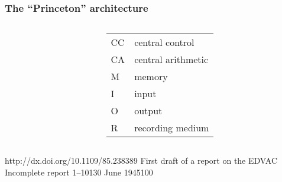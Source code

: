 \documentclass[dvipsnames,presentation,aspectratio=169,14pt]{beamer}
\begin{document}
\begin{frame}
  \frametitle{The ``Princeton'' architecture}

  \vfill

  \begin{columns}
    \begin{column}[c]{0.5\textwidth}
      \centering
    \end{column}
    \qquad
    \begin{column}[c]{0.35\textwidth}
      \setlength\tabcolsep{5pt}
      \begin{tabular}{ll}
        \color{cpufg}CC  & \color{cpufg}central control\\
        \color{cpufg}CA  & \color{cpufg}central arithmetic\\
        \color{memfg}M   & \color{memfg}memory\\
        \color{incol}I   & \color{incol}input\\
        \color{outcol}O  & \color{outcol}output\\
        \color{recfg}R   & \color{recfg}recording medium
      \end{tabular}
    \end{column}
  \end{columns}

  \vfill

  \begin{thebibliography}{99}
   
    {http://dx.doi.org/10.1109/85.238389}
    {First draft of a report on the EDVAC}
    {Incomplete report}
    {1--101}{30 June 1945}{100}
  \end{thebibliography}
\end{frame}
\end{document}

